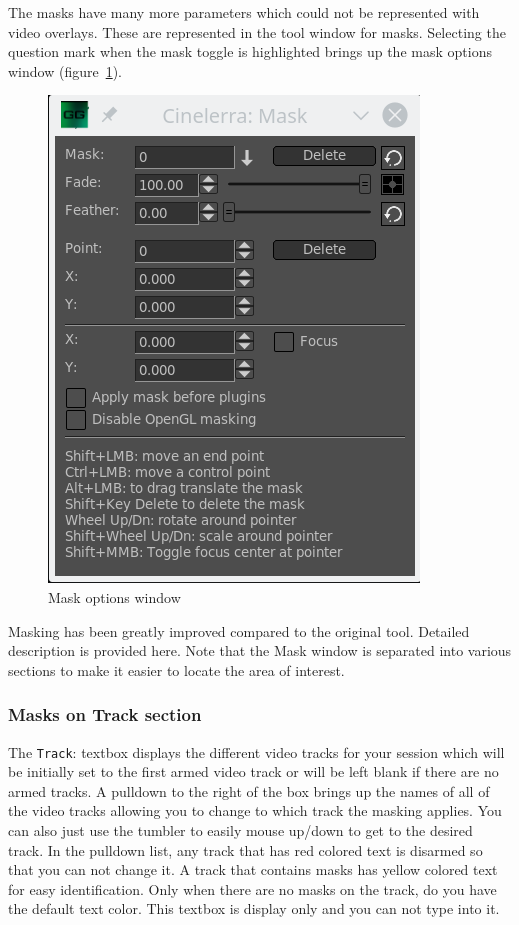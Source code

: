 The masks have many more parameters which could not be represented with video overlays. 
These are represented in the tool window for masks. 
Selecting the question mark when the mask toggle is highlighted brings up the mask options window (figure~\ref{fig:mask_window}).

\begin{figure}[htpb]
    \centering
    \includegraphics[width=0.6\linewidth]{images/mask_window.png}
    \caption{Mask options window}
    \label{fig:mask_window}
\end{figure}

Masking has been greatly improved compared to the original tool.  Detailed description is provided here.  Note that the Mask window is separated into various sections to make it easier to locate the area of interest.

\subsubsection*{Masks on Track section}%
\label{ssub:masks_track_section}

The \texttt{Track}: textbox displays the different video tracks for your session which will be initially set to the first armed video track or will be left blank if there are no armed tracks.  A pulldown to the right of the box brings up the names of all of the video tracks allowing you to change to which track the masking applies.  You can also just use the tumbler to easily mouse up/down to get to the desired track. In the pulldown list, any track that has red colored text is disarmed so that you can not change it.  A track that contains masks has yellow colored text for easy identification.  Only when there are no masks on the track, do you have the default text color. This textbox is display only and you can not type into it.

